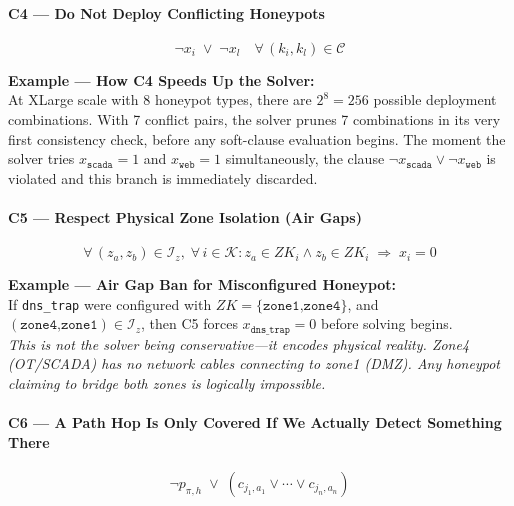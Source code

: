 \documentclass[journal]{IEEEtran}
\newcommand{\calK}{\mathcal{K}}
\newcommand{\calC}{\mathcal{C}}
\begin{document}
\paragraph{C4 --- Do Not Deploy Conflicting Honeypots}
\begin{equation}
  \neg x_i \;\vee\; \neg x_l
  \quad \forall\,(k_i,k_l) \in \calC
\end{equation}

\begin{examplebox}
\textbf{Example --- How C4 Speeds Up the Solver:}\\[3pt]
At XLarge scale with 8 honeypot types, there are
$2^8=256$ possible deployment combinations.
With 7 conflict pairs, the solver prunes 7 combinations
in its very first consistency check, before any
soft-clause evaluation begins.
The moment the solver tries
$x_{\texttt{scada}}=1$ and $x_{\texttt{web}}=1$
simultaneously, the clause
$\neg x_{\texttt{scada}} \vee \neg x_{\texttt{web}}$
is violated and this branch is immediately discarded.
\end{examplebox}

\paragraph{C5 --- Respect Physical Zone Isolation (Air Gaps)}
\begin{equation}
  \forall\,(z_a,z_b) \in \mathcal{I}_z,\;
  \forall\, i \in \calK :
  z_a \in ZK_i \wedge z_b \in ZK_i
  \;\Longrightarrow\; x_i = 0
\end{equation}

\begin{examplebox}
\textbf{Example --- Air Gap Ban for Misconfigured Honeypot:}\\[3pt]
If \texttt{dns\_trap} were configured with
$ZK=\{\texttt{zone1,zone4}\}$, and
$(\texttt{zone4,zone1}) \in \mathcal{I}_z$, then C5
forces $x_{\texttt{dns\_trap}}=0$ before solving begins.\\[3pt]
\textit{This is not the solver being conservative---it
encodes physical reality.
Zone4 (OT/SCADA) has no network cables connecting to
zone1 (DMZ).
Any honeypot claiming to bridge both zones is logically
impossible.}
\end{examplebox}

\paragraph{C6 --- A Path Hop Is Only Covered If We Actually
Detect Something There}
\begin{equation}
  \neg p_{\pi,h} \;\vee\;
  (c_{j_1,a_1} \vee \cdots \vee c_{j_n,a_n})
\end{equation}
\end{document}
